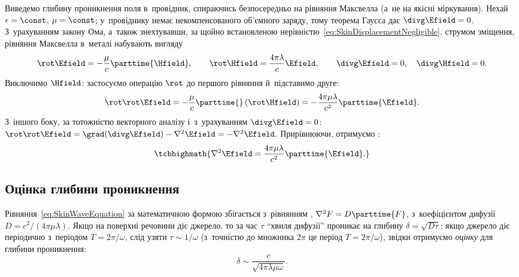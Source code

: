 Виведемо глибину проникнення поля в~провідник, спираючись безпосередньо на рівняння
Максвелла (а~не на якісні міркування). Нехай $\epsilon=\const$, $\mu=\const$; у~провіднику
немає некомпенсованого об'ємного заряду, тому теорема Гаусса дає $\divg\Efield=0$.
З~урахуванням закону Ома, а~також знехтувавши, за щойно встановленою
нерівністю~\eqref{eq:SkinDisplacementNegligible}, струмом зміщення, рівняння Максвелла
в~металі набувають вигляду
\begin{equation*}
	\rot\Efield = -\frac{\mu}c\parttime{\Hfield}, \qquad \rot\Hfield = \frac{4\pi\lambda}{c}\Efield, \qquad \divg\Efield=0, \quad \divg\Hfield=0.
\end{equation*}
Виключимо $\Hfield$: застосуємо операцію $\rot$ до першого рівняння й~підставимо друге:
\begin{equation*}
	\rot\rot\Efield = -\frac{\mu}c\parttime{}\left(\rot\Hfield\right) = -\frac{4\pi\mu\lambda}{c^2}\parttime{\Efield}.
\end{equation*}
З~іншого боку, за тотожністю векторного аналізу і~з~урахуванням $\divg\Efield=0$:
$\rot\rot\Efield = \grad(\divg\Efield)-\nabla^2\Efield = -\nabla^2\Efield$. Прирівнюючи,
отримуємо :
\begin{equation}\label{eq:SkinWaveEquation}
	\tcbhighmath{
		\nabla^2\Efield = \frac{4\pi\mu\lambda}{c^2}\parttime{\Efield}.
	}
\end{equation}


\subsection*{Оцінка глибини проникнення}


Рівняння~\eqref{eq:SkinWaveEquation} за математичною формою збігається з~рівнянням
, $\nabla^2 F = D\parttime{F}$, з~коефіцієнтом дифузії $D =
c^2/(4\pi\mu\lambda)$. Якщо на поверхні речовини діє джерело, то за час $\tau$
\enquote{хвиля дифузії} проникає на глибину $\delta=\sqrt{D\tau}$; якщо джерело діє
періодично з~періодом $T=2\pi/\omega$, слід узяти $\tau\sim1/\omega$ (з~точністю до
множника $2\pi$ це період $T=2\pi/\omega$), звідки отримуємо \emph{оцінку} для глибини
проникнення:
\begin{equation}\label{eq:SkinDepthEstimate}
	\delta \sim \frac{c}{\sqrt{4\pi\lambda\mu\omega}}.
\end{equation}

